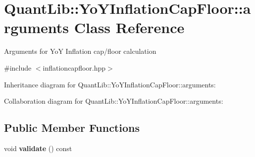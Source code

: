 \section{Quant\+Lib\+:\+:Yo\+Y\+Inflation\+Cap\+Floor\+:\+:arguments Class Reference}
\label{class_quant_lib_1_1_yo_y_inflation_cap_floor_1_1arguments}


Arguments for YoY Inflation cap/floor calculation  




{\ttfamily \#include $<$inflationcapfloor.\+hpp$>$}



Inheritance diagram for Quant\+Lib\+:\+:Yo\+Y\+Inflation\+Cap\+Floor\+:\+:arguments\+:


Collaboration diagram for Quant\+Lib\+:\+:Yo\+Y\+Inflation\+Cap\+Floor\+:\+:arguments\+:
\subsection*{Public Member Functions}
\begin{DoxyCompactItemize}
\item 
void {\bfseries validate} () const \label{class_quant_lib_1_1_yo_y_inflation_cap_floor_1_1arguments_a17eca866bbe38b02fddd2aabcb47762e}

\end{DoxyCompactItemize}
